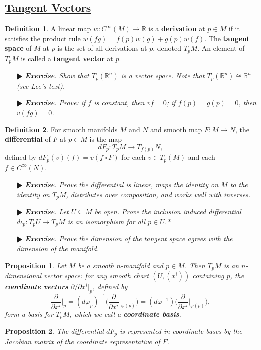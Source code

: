 \documentclass[11pt]{amsart}
\newtheorem*{proposition*}{Proposition}
\theoremstyle{definition}
\newtheorem*{definition*}{Definition}
\renewcommand\:{\colon}
\newcommand{\R}{\mathds{R}}
\newcommand{\1}{\mathds{1}}
\newcommand{\exc}[1]{\vspace{-2.5pt}\begin{itemize}[leftmargin=15pt]\item[$\RHD$] \textit{\textbf{Exercise}. #1}\end{itemize}}
\begin{document}
\subsection*{\underline{Tangent Vectors}}

\begin{definition*}
	A linear map $w\: C^\infty(M) \to \R$ is a \textbf{derivation} at $p \in M$ if it satisfies the product rule $w(fg) = f(p)w(g) + g(p)w(f)$. The \textbf{tangent space} of $M$ at $p$ is the set of all derivations at $p$, denoted $T_p M$. An element of $T_p M$ is called a \textbf{tangent vector} at $p$.
\end{definition*}

\exc{Show that $T_p(\R^n)$ is a vector space. Note that $T_p(\R^n) \cong \R^n$ (see Lee's text).}
\exc{Prove: if $f$ is constant, then $vf = 0$; if $f(p) = g(p) = 0$, then $v(fg) = 0$.}

\begin{definition*}
	For smooth manifolds $M$ and $N$ and smooth map $F\: M \to N$, the \textbf{differential} of $F$ at $p \in M$ is the map
		\[ dF_p\: T_pM \to T_{f(p)} N, \]
	defined by $dF_p(v)(f) = v(f \circ F)$ for each $v \in T_p(M)$ and each $f \in C^\infty(N)$.
\end{definition*}

\exc{Prove the differential is linear, maps the identity on $M$ to the identity on $T_pM$, distributes over composition, and works well with inverses.}
\exc{Let $U \subseteq M$ be open. Prove the inclusion induced differential $d\iota_p\: T_pU \to T_pM$ is an isomorphism for all $p \in U$.*}
\exc{Prove the dimension of the tangent space agrees with the dimension of the manifold.}

\begin{proposition*}
	Let $M$ be a smooth $n$-manifold and $p \in M$. Then $T_pM$ is an $n$-dimensional vector space: for any smooth chart $(U, (x^i))$ containing $p$, the \textbf{coordinate vectors} $\partial/\partial x^i\vert_p$, defined by
		\[ \frac\partial{\partial x^i}\bigg\vert_p = (d\varphi_p)^{-1}\bigg( \frac\partial{\partial x^i}\bigg\vert_{\varphi(p)} \bigg) = (d\varphi^{-1})\bigg( \frac\partial{\partial x^i}\bigg\vert_{\varphi(p)} \bigg), \]
	form a basis for $T_pM$, which we call a \textbf{coordinate basis}.
\end{proposition*}

\begin{proposition*}
	The differential $dF_p$ is represented in coordinate bases by the Jacobian matrix of the coordinate representative of $F$.
\end{proposition*}
\end{document}
